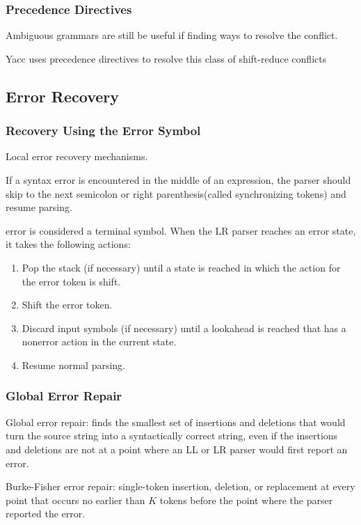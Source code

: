 \subsubsection{Precedence Directives}
Ambiguous grammars are still be useful if finding ways to resolve the conflict.

Yacc uses precedence directives to resolve this class of shift-reduce conflicts

\subsection{Error Recovery}
\subsubsection{Recovery Using the Error Symbol}
Local error recovery mechanisms.

If a syntax error is encountered in the middle of an expression, the parser should skip to the next semicolon or right parenthesis(called synchronizing tokens) and resume parsing.

error is considered a terminal symbol. When the LR parser reaches an error state, it takes the following actions:
\begin{enumerate}
    \item Pop the stack (if necessary) until a state is reached in which the action for the error token is shift.
    \item Shift the error token.
    \item Discard input symbols (if necessary) until a lookahead is reached that has a nonerror action in the current state.
    \item Resume normal parsing.
\end{enumerate}

\subsubsection{Global Error Repair}
Global error repair: finds the smallest set of insertions and deletions that would turn the source string into a syntactically correct string, even if the insertions and deletions are not at a point where an LL or LR parser would first report an error.

Burke-Fisher error repair: single-token insertion, deletion, or replacement at every point that occurs no earlier than $K$ tokens before the point where the parser reported the error.